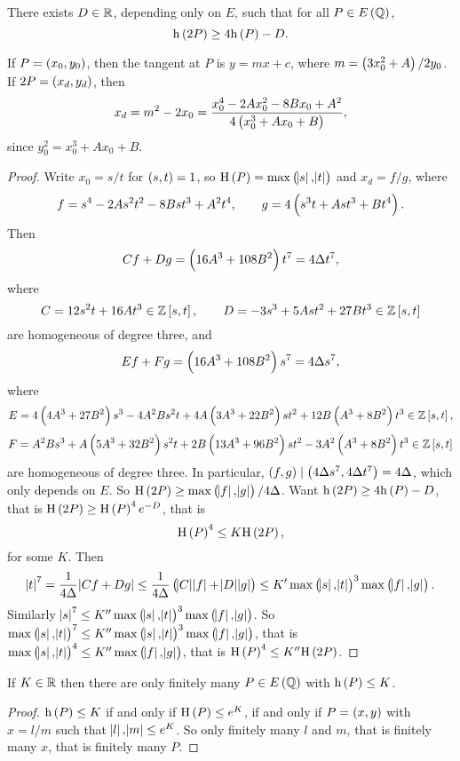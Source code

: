 \begin{lemma}
There exists $ D \in \mathbb{R} $, depending only on $ E $, such that for all $ P \in E\br{\QQ} $,
$$ \h\br{2P} \ge 4\h\br{P} - D. $$
\end{lemma}

If $ P = \br{x_0, y_0} $, then the tangent at $ P $ is $ y = mx + c $, where $ m = \br{3x_0^2 + A} / 2y_0 $. If $ 2P = \br{x_d, y_d} $, then
$$ x_d = m^2 - 2x_0 = \dfrac{x_0^4 - 2Ax_0^2 - 8Bx_0 + A^2}{4\br{x_0^3 + Ax_0 + B}}, $$
since $ y_0^2 = x_0^3 + Ax_0 + B $.

\begin{proof}
Write $ x_0 = s / t $ for $ \br{s, t} = 1 $, so $ \H\br{P} = \max\br{\abs{s}, \abs{t}} $ and $ x_d = f / g $, where
$$ f = s^4 - 2As^2t^2 - 8Bst^3 + A^2t^4, \qquad g = 4\br{s^3t + Ast^3 + Bt^4}. $$
Then
$$ Cf + Dg = \br{16A^3 + 108B^2}t^7 = 4\Delta t^7, $$
where
$$ C = 12s^2t + 16At^3 \in \ZZ\sbr{s, t}, \qquad D = -3s^3 + 5Ast^2 + 27Bt^3 \in \ZZ\sbr{s, t} $$
are homogeneous of degree three, and
$$ Ef + Fg = \br{16A^3 + 108B^2}s^7 = 4\Delta s^7, $$
where
$$ E = 4\br{4A^3 + 27B^2}s^3 - 4A^2Bs^2t + 4A\br{3A^3 + 22B^2}st^2 + 12B\br{A^3 + 8B^2}t^3 \in \ZZ\sbr{s, t}, $$
$$ F = A^2Bs^3 + A\br{5A^3 + 32B^2}s^2t + 2B\br{13A^3 + 96B^2}st^2 - 3A^2\br{A^3 + 8B^2}t^3 \in \ZZ\sbr{s, t} $$
are homogeneous of degree three. In particular, $ \br{f, g} \mid \br{4\Delta s^7, 4\Delta t^7} = 4\Delta $, which only depends on $ E $. So $ \H\br{2P} \ge \max\br{\abs{f}, \abs{g}} / 4\Delta $. Want $ \h\br{2P} \ge 4\h\br{P} - D $, that is $ \H\br{2P} \ge \H\br{P}^4e^{-D} $, that is
$$ \H\br{P}^4 \le K\H\br{2P}, $$
for some $ K $. Then
$$ \abs{t}^7 = \dfrac{1}{4\Delta}\abs{Cf + Dg} \le \dfrac{1}{4\Delta}\br{\abs{C}\abs{f} + \abs{D}\abs{g}} \le K'\max\br{\abs{s}, \abs{t}}^3\max\br{\abs{f}, \abs{g}}. $$
Similarly $ \abs{s}^7 \le K''\max\br{\abs{s}, \abs{t}}^3\max\br{\abs{f}, \abs{g}} $. So $ \max\br{\abs{s}, \abs{t}}^7 \le K''\max\br{\abs{s}, \abs{t}}^3\max\br{\abs{f}, \abs{g}} $, that is $ \max\br{\abs{s}, \abs{t}}^4 \le K''\max\br{\abs{f}, \abs{g}} $, that is $ \H\br{P}^4 \le K''\H\br{2P} $.
\end{proof}

\begin{lemma}
If $ K \in \mathbb{R} $ then there are only finitely many $ P \in E\br{\QQ} $ with $ \h\br{P} \le K $.
\end{lemma}

\begin{proof}
$ \h\br{P} \le K $ if and only if $ \H\br{P} \le e^K $, if and only if $ P = \br{x, y} $ with $ x = l / m $ such that $ \abs{l}, \abs{m} \le e^K $. So only finitely many $ l $ and $ m $, that is finitely many $ x $, that is finitely many $ P $.
\end{proof}

